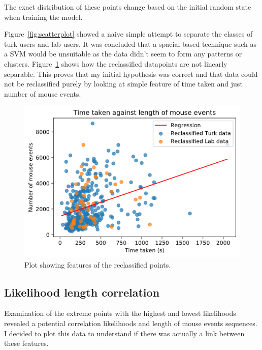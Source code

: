 \documentclass{article}
\begin{document}
The exact distribution of these points change based on the initial random state when training the model.

Figure~\ref{fig:scatterplot} showed a naive simple attempt to separate the classes of turk users and lab users.
It was concluded that a spacial based technique such as a SVM would be unsuitable as the data didn't seem to form any patterns or clusters.
Figure~\ref{fig:Reclassified-Scatterplot} shows how the reclassified datapoints are not linearly separable.
This proves that my initial hypothesis was correct and that data could not be reclassified purely by looking at simple feature of time taken and just number of mouse events.

\begin{figure}[ht!]
    \centering
    \includegraphics[scale=0.5]{Images/TimeTaken-Mouse-Events-Reclassified.png}
    \caption{Plot showing features of the reclassified points. }
    \label{fig:Reclassified-Scatterplot}
\end{figure}

\subsection{Likelihood length correlation}

Examination of the extreme points with the highest and lowest likelihoods revealed a potential correlation likelihoods and length of mouse events sequences.
I decided to plot this data to understand if there was actually a link between these features.
\end{document}
